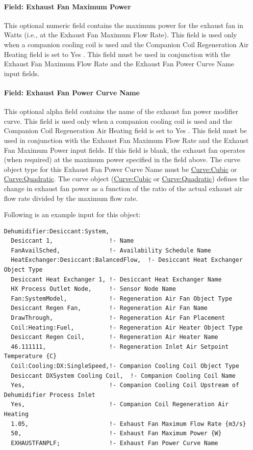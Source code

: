 \paragraph{Field: Exhaust Fan Maximum Power}\label{field-exhaust-fan-maximum-power}

This optional numeric field contains the maximum power for the exhaust fan in Watts (i.e., at the Exhaust Fan Maximum Flow Rate). This field is used only when a companion cooling coil is used and the Companion Coil Regeneration Air Heating field is set to Yes . This field must be used in conjunction with the Exhaust Fan Maximum Flow Rate and the Exhaust Fan Power Curve Name input fields.

\paragraph{Field: Exhaust Fan Power Curve Name}\label{field-exhaust-fan-power-curve-name}

This optional alpha field contains the name of the exhaust fan power modifier curve. This field is used only when a companion cooling coil is used and the Companion Coil Regeneration Air Heating field is set to Yes . This field must be used in conjunction with the Exhaust Fan Maximum Flow Rate and the Exhaust Fan Maximum Power input fields. If this field is blank, the exhaust fan operates (when required) at the maximum power specified in the field above. The curve object type for this Exhaust Fan Power Curve Name must be \hyperref[curvecubic]{Curve:Cubic} or \hyperref[curvequadratic]{Curve:Quadratic}. The curve object (\hyperref[curvecubic]{Curve:Cubic} or \hyperref[curvequadratic]{Curve:Quadratic}) defines the change in exhaust fan power as a function of the ratio of the actual exhaust air flow rate divided by the maximum flow rate.

Following is an example input for this object:

\begin{lstlisting}
Dehumidifier:Desiccant:System,
  Desiccant 1,                !- Name
  FanAvailSched,              !- Availability Schedule Name
  HeatExchanger:Desiccant:BalancedFlow,  !- Desiccant Heat Exchanger Object Type
  Desiccant Heat Exchanger 1, !- Desiccant Heat Exchanger Name
  HX Process Outlet Node,     !- Sensor Node Name
  Fan:SystemModel,            !- Regeneration Air Fan Object Type
  Desiccant Regen Fan,        !- Regeneration Air Fan Name
  DrawThrough,                !- Regeneration Air Fan Placement
  Coil:Heating:Fuel,          !- Regeneration Air Heater Object Type
  Desiccant Regen Coil,       !- Regeneration Air Heater Name
  46.111111,                  !- Regeneration Inlet Air Setpoint Temperature {C}
  Coil:Cooling:DX:SingleSpeed,!- Companion Cooling Coil Object Type
  Desiccant DXSystem Cooling Coil,  !- Companion Cooling Coil Name
  Yes,                        !- Companion Cooling Coil Upstream of Dehumidifier Process Inlet
  Yes,                        !- Companion Coil Regeneration Air Heating
  1.05,                       !- Exhaust Fan Maximum Flow Rate {m3/s}
  50,                         !- Exhaust Fan Maximum Power {W}
  EXHAUSTFANPLF;              !- Exhaust Fan Power Curve Name
\end{lstlisting}

